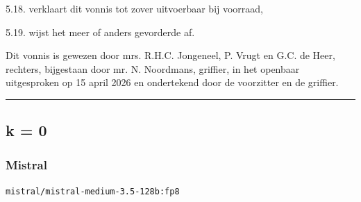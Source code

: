 \documentclass[
  dutch,
  a4paper,
]{article}
\begin{document}
5.18. verklaart dit vonnis tot zover uitvoerbaar bij voorraad,

5.19. wijst het meer of anders gevorderde af.

Dit vonnis is gewezen door mrs. R.H.C. Jongeneel, P. Vrugt en G.C. de Heer, rechters, bijgestaan door mr. N. Noordmans, griffier, in het openbaar uitgesproken op 15 april 2026 en ondertekend door de voorzitter en de griffier.

\begin{center}\rule{0.5\linewidth}{0.5pt}\end{center}

\newpage


\subsection{k = 0}\label{k-0-2}

\subsubsection{Mistral}\label{mistral-6}

\texttt{mistral/mistral-medium-3.5-128b:fp8}
\end{document}
